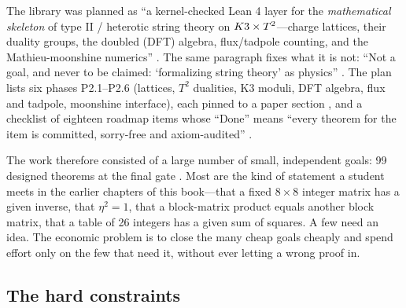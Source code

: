 The library  was
planned as ``a kernel-checked Lean 4 layer for the \emph{mathematical skeleton} of type II /
heterotic string theory on $K3\times T^2$---charge lattices, their duality groups, the doubled (DFT)
algebra, flux/tadpole counting, and the Mathieu-moonshine numerics'' . The same paragraph fixes what it is not: ``Not a goal, and never to be
claimed: `formalizing string theory' as physics'' . The plan lists six phases P2.1--P2.6 (lattices, $T^2$ dualities, K3 moduli,
DFT algebra, flux and tadpole, moonshine interface), each pinned to a paper section
, and a checklist of eighteen roadmap items whose
``Done'' means ``every theorem for the item is committed, sorry-free and axiom-audited''
.

The work therefore consisted of a large number of small, independent goals: 99 designed
theorems at the final gate . Most are the
kind of statement a student meets in the earlier chapters of this book---that a fixed
$8\times8$ integer matrix has a given inverse, that $\eta^2=1$, that a block-matrix product
equals another block matrix, that a table of 26 integers has a given sum of squares. A few
need an idea. The economic problem is to close the many cheap goals cheaply and spend
effort only on the few that need it, without ever letting a wrong proof in.

\subsection{The hard constraints}\label{sec:pipeline:constraints}


